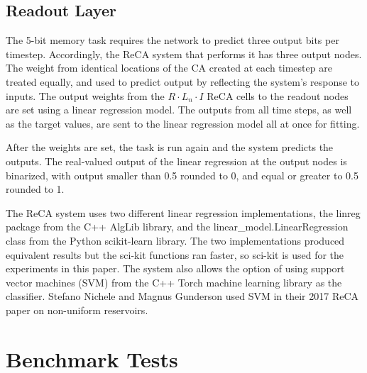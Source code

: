 \documentclass{elsarticle}
\begin{document}
\begin{multicols}{2}
\subsection{Readout Layer}
The 5-bit memory task requires the network to predict three output bits per 
timestep.  Accordingly, the ReCA system that performs it has three output 
nodes.  The weight from identical locations of the CA created at each timestep 
are treated equally, and used to predict output by reflecting the system's 
response to inputs. The output weights from the $R \cdot L_{n} \cdot I$ ReCA 
cells to the readout nodes are set using a linear regression model. The outputs 
from all time steps, as well as the target values, are sent to the linear 
regression model all at once for fitting.  \par
After the weights are set, the task is run again and the system predicts the 
outputs. The real-valued output of the linear regression at the output nodes is 
binarized, with output smaller than 0.5 rounded to 0, and equal or greater to 
0.5 rounded to 1. \par The ReCA system uses two different linear regression 
implementations, the linreg package from the C++ AlgLib library, and the 
linear\_model.LinearRegression class from the Python scikit-learn library.  The 
two implementations produced equivalent results but the sci-kit functions ran 
faster, so sci-kit is used for the experiments in this paper. The system also 
allows the option of  using support vector machines (SVM) from the C++ Torch 
machine learning library as the classifier.  Stefano Nichele and Magnus 
Gunderson used SVM in their 2017 ReCA paper on non-uniform 
reservoirs\cite{nichele2017reservoir}.

\section{Benchmark Tests}\label{Benchmarks}

\end{multicols}
\end{document}
